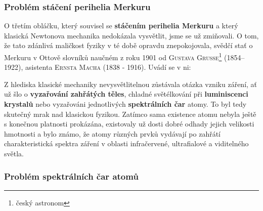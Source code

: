       \subsubsection{Problém stáčení perihelia Merkuru}\label{fyz:IchapIIsecIVssecIsssecII}  

        O třetím obláčku, který souvisel se \textbf{stáčením perihelia Merkuru} a který klasická
        Newtonova mechanika nedokázala vysvětlit, jsme se už zmiňovali. O tom, že tato zdánlivá
        maličkost fyziky v té době opravdu znepokojovala, svědčí stať o Merkuru v Ottově slovníků
        naučném z roku 1901 od \textsc{Gustava Grusse}\footnote{český astronom} (1854–1922),
        asistenta \textsc{Ernsta Macha} (1838 - 1916). Uvádí se v ni: \emph{} 


      Z hlediska klasické mechaniky nevysvětlitelnou zůstávala otázka vzniku záření, ať už šlo o
      \textbf{vyzařování zahřátých těles}, chladné světélkování při \textbf{luminiscenci krystalů}
      nebo vyzařováni jednotlivých \textbf{spektrálních čar} atomy. To byl tedy skutečný mrak nad
      klasickou fyzikou. Zatímco sama existence atomu nebyla ještě s konečnou platnosti prokázána,
      existovaly už dosti dobré odhady jejich velikosti hmotnosti a bylo známo, že atomy různých
      prvků vydávají po zahřátí charakteristická spektra záření v oblasti infračervené, ultrafialové
      a viditelného světla.

      \subsubsection{Problém spektrálních čar atomů}\label{fyz:IchapIIsecIVssecIsssecIII}

